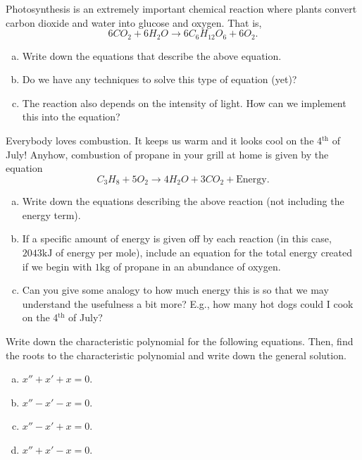 \begin{problem}
    Photosynthesis is an extremely important chemical reaction where plants convert carbon dioxide and water into glucose and oxygen. That is,
    \[
        6CO_2 + 6H_2O \to 6C_6 H_{12} O_6 + 6 O_2.
    \]
    \begin{enumerate}[(a)]
        \item Write down the equations that describe the above equation.
        \item Do we have any techniques to solve this type of equation (yet)?
        \item The reaction also depends on the intensity of light.  How can we implement this into the equation?
    \end{enumerate}
\end{problem}

\begin{problem}
Everybody loves combustion. It keeps us warm and it looks cool on the 4$^\textrm{th}$ of July!  Anyhow, combustion of propane in your grill at home is given by the equation
    \[
        C_3 H_8 + 5O_2 \to 4H_2O + 3CO_2 + \textrm{Energy}.
    \]
    \begin{enumerate}[(a)]
        \item Write down the equations describing the above reaction (not including the energy term).
        \item If a specific amount of energy is given off by each reaction (in this case, $2043\textrm{kJ}$ of energy per mole), include an equation for the total energy created if we begin with $1\textrm{kg}$ of propane in an abundance of oxygen.
        \item Can you give some analogy to how much energy this is so that we may understand the usefulness a bit more? E.g., how many hot dogs could I cook on the 4$^\textrm{th}$ of July?
    \end{enumerate}

\end{problem}

\begin{problem}
Write down the characteristic polynomial for the following equations.  Then, find the roots to the characteristic polynomial and write down the general solution.
\begin{enumerate}[(a)]
    \item $x''+x'+x=0$.
    \item $x''-x'-x=0$.
    \item $x''-x'+x=0$.
    \item $x''+x'-x=0$.
\end{enumerate}
\end{problem}

